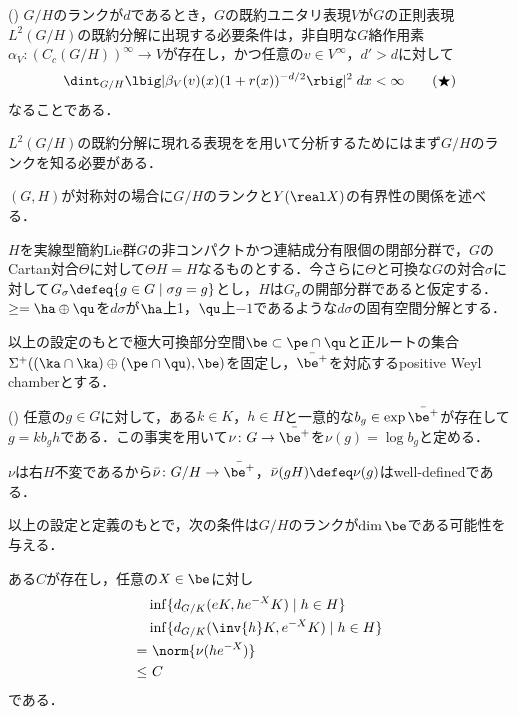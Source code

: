 \begin{thm*}(\cite[pp.~665--6]{ber88})\label{thm:plancherel}
  $G/H$のランクが$d$であるとき，$G$の既約ユニタリ表現$V$が$G$の正則表現$L^2(G/H)$の既約分解に出現する必要条件は，非自明な$G$絡作用素$\alpha_V\colon (C_c(G/H))^{\infty}\to V $が存在し，かつ任意の$v\in V^{\infty} $，$d' > d$に対して
  \begin{align}
    \dint_{G/H}\lbig|\beta_V(v)(x)(1+r(x))^{-d/2} \rbig|^2\; dx < \infty\label{eq:ber88}\tag{$\bigstar$}
  \end{align}
  なることである．%
\end{thm*}

$L^2(G/H)$の既約分解に現れる表現をを用いて分析するためにはまず$G/H$のランクを知る必要がある．

$(G,H)$が対称対の場合に$G/H$のランクと$Y(\real X) $の有界性の関係を述べる．
\begin{setting*}
  $H$を実線型簡約Lie群$G$の非コンパクトかつ連結成分有限個の閉部分群で，$G$のCartan対合$\Theta$に対して$\Theta H = H$なるものとする．今さらに$\Theta $と可換な$G$の対合$\sigma$に対して$G_{\sigma}\defeq \{g\in G \mid \sigma g = g \} $とし，$H$は$G_{\sigma} $の開部分群であると仮定する．$\ge = \ha\oplus \qu $を$d\sigma $が$\ha$上1，$\qu$上${-1}$であるような$d\sigma$の固有空間分解とする．

  以上の設定のもとで極大可換部分空間$\be\subset \pe\cap \qu $と正ルートの集合$\Sigma^{+}((\ka\cap\ka)\oplus(\pe\cap \qu), \be ) $を固定し，$\bar{\be^{+}} $を対応するpositive Weyl chamberとする．
\end{setting*}
\begin{thmdef*}(\cite[p.~151]{kk16})
  任意の$g\in G$に対して，ある$k\in K$，$h\in H$と一意的な$b_g\in \exp\bar{\be^{+}} $が存在して$g = kb_gh$である．この事実を用いて$\nu\colon G\to \bar{\be^{+}} $を$\nu(g) = \log b_{g} $と定める．
\end{thmdef*}

$\nu$は右$H$不変であるから$\bar{\nu}\colon G/H\to \bar{\be^{+}} $，$\bar{\nu}(gH) \defeq \nu(g) $はwell-definedである．

以上の設定と定義のもとで，次の条件は$G/H$のランクが$\dim \be $である可能性を与える．
\begin{cond*}
  ある$C$が存在し，任意の$X \in \be $に対し
  \begin{align*}
    &\inf\{d_{G/K}(eK,  he^{-X}K)\mid h\in H \}  \\
    &\inf\{d_{G/K}(\inv{h}K,  e^{-X}K)\mid h\in H \}  \\
    =&\ \norm{\nu(he^{-X})} \\
    \leq&\ C
  \end{align*}
  である．
\end{cond*}

